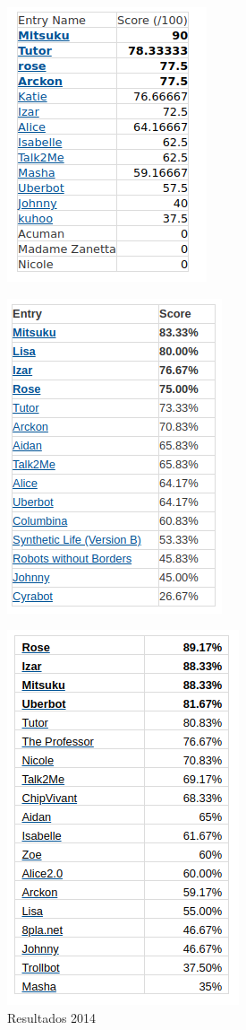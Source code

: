 \documentclass{article}
\begin{document}
\begin{figure}[H]
\centering
\begin{minipage}{.5\textwidth}
  \centering
  \includegraphics[width=.4\linewidth]{TT2016}
  \label{fig:tt2016}
\end{minipage}%
\begin{minipage}{.5\textwidth}
  \centering
  \includegraphics[width=.4\linewidth]{TT2015}
  \label{fig:tt2015}
\end{minipage}
\end{figure}

\begin{figure}[H]
  \centering
  \includegraphics[width=.4\linewidth]{TT2014}
  \caption{Resultados 2014}
  \label{fig:tt2014}
\end{figure}
\end{document}
